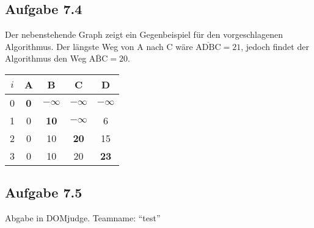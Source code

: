 \documentclass{article}
\begin{document}
    \subsection*{Aufgabe 7.4}
    \begin{minipage}{0.4\linewidth}
        Der nebenstehende Graph zeigt ein Gegenbeispiel für den vorgeschlagenen Algorithmus. Der längste Weg von A nach C wäre $\overline{\text{ADBC}}= 21$, jedoch findet der Algorithmus den Weg $\overline{\text{ABC}} = 20$. 
    \end{minipage} \hspace{0.05\linewidth}
    \begin{minipage}{0.2\linewidth}
        \centering
    \end{minipage}\hspace{0.05\linewidth}
    \begin{minipage}{0.3\linewidth}
        \centering
        \begin{tabular}{c|cccc}
            $i$ & A & B & C & D \\ \hline
            0   & \textbf{0} & $-\infty$ & $-\infty$ & $-\infty$ \\
            1   & 0 & \textbf{10} & $-\infty$ & 6 \\
            2   & 0 & 10 & \textbf{20} & 15 \\
            3   & 0 & 10 & 20 & \textbf{23} \\
        \end{tabular}
    \end{minipage}

    \subsection*{Aufgabe 7.5}
    Abgabe in DOMjudge. Teamname: "`test"'
\end{document}
